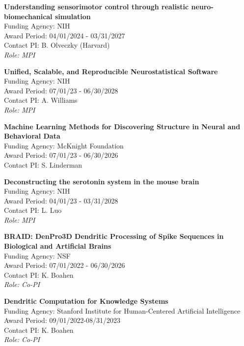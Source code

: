 \documentclass[10pt]{article}
\begin{document}
\begin{outerlist}
    
\item \textbf{Understanding sensorimotor control through realistic neuro-biomechanical simulation} \\
  Funding Agency: NIH \\
  Award Period: 04/01/2024 - 03/31/2027 \\
  Contact PI: B. Olveczky (Harvard) \\
  \textit{Role: MPI}

\item \textbf{Unified, Scalable, and Reproducible Neurostatistical Software} \\
  Funding Agency: NIH \\
  Award Period: 07/01/23 - 06/30/2028 \\
  Contact PI: A. Williams \\
  \textit{Role: MPI}
  
\item \textbf{Machine Learning Methods for Discovering Structure in Neural and Behavioral Data} \\
  Funding Agency: McKnight Foundation \\
  Award Period: 07/01/23 - 06/30/2026 \\
  Contact PI: S. Linderman

\item \textbf{Deconstructing the serotonin system in the mouse brain} \\
  Funding Agency: NIH \\
  Award Period: 04/01/23 - 03/31/2028 \\
  Contact PI: L. Luo \\
  \textit{Role: MPI}

\item \textbf{BRAID: DenPro3D Dendritic Processing of Spike Sequences in Biological and Artificial Brains} \\
  Funding Agency: NSF \\
  Award Period: 07/01/2022 - 06/30/2026\\
  Contact PI: K. Boahen\\
  \textit{Role: Co-PI}
  
\item \textbf{Dendritic Computation for Knowledge Systems} \\
  Funding Agency: Stanford Institute for Human-Centered Artificial Intelligence \\
  Award Period: 09/01/2022-08/31/2023\\
  Contact PI: K. Boahen \\
  \textit{Role: Co-PI}
  

\end{outerlist}
\end{document}
